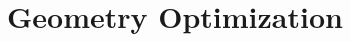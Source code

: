\section{Geometry Optimization} \label{sec:opt}
\renewcommand{\optionname}[2]{\texttt{\nameref{op-#2-#1}}}

%
%
%
%
